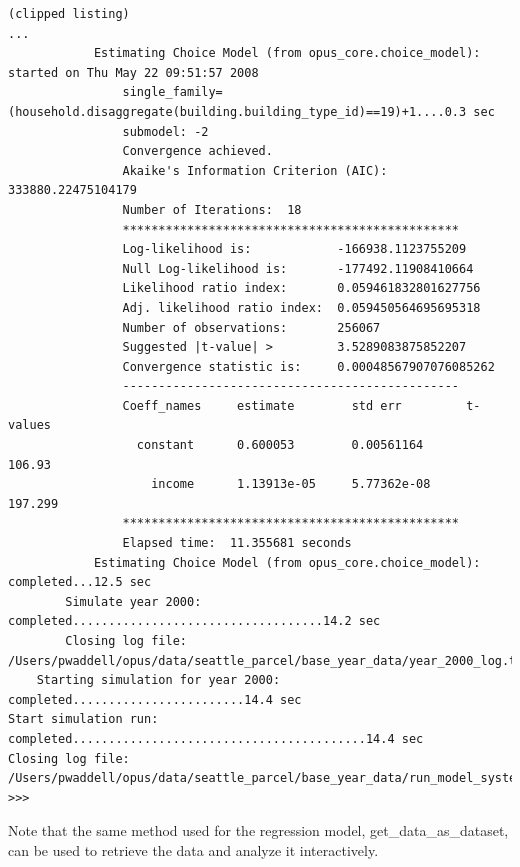 \begin{lstlisting}
(clipped listing)
...
            Estimating Choice Model (from opus_core.choice_model): started on Thu May 22 09:51:57 2008
                single_family=(household.disaggregate(building.building_type_id)==19)+1....0.3 sec
                submodel: -2
                Convergence achieved.
                Akaike's Information Criterion (AIC):  333880.22475104179
                Number of Iterations:  18
                ***********************************************
                Log-likelihood is:            -166938.1123755209
                Null Log-likelihood is:       -177492.11908410664
                Likelihood ratio index:       0.059461832801627756
                Adj. likelihood ratio index:  0.059450564695695318
                Number of observations:       256067
                Suggested |t-value| >         3.5289083875852207
                Convergence statistic is:     0.00048567907076085262
                -----------------------------------------------
                Coeff_names     estimate        std err         t-values
                  constant      0.600053        0.00561164        106.93
                    income      1.13913e-05     5.77362e-08      197.299
                ***********************************************
                Elapsed time:  11.355681 seconds
            Estimating Choice Model (from opus_core.choice_model): completed...12.5 sec
        Simulate year 2000: completed...................................14.2 sec
        Closing log file: /Users/pwaddell/opus/data/seattle_parcel/base_year_data/year_2000_log.txt
    Starting simulation for year 2000: completed........................14.4 sec
Start simulation run: completed.........................................14.4 sec
Closing log file: /Users/pwaddell/opus/data/seattle_parcel/base_year_data/run_model_system.log
>>> 
\end{lstlisting}

Note that the same method used for the regression model, get\_data\_as\_dataset, can be used to retrieve the data and analyze it interactively. 

%
%

